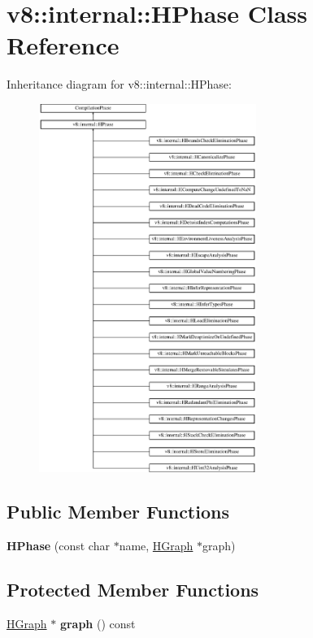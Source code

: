 \hypertarget{classv8_1_1internal_1_1_h_phase}{}\section{v8\+:\+:internal\+:\+:H\+Phase Class Reference}
\label{classv8_1_1internal_1_1_h_phase}
Inheritance diagram for v8\+:\+:internal\+:\+:H\+Phase\+:\begin{figure}[H]
\begin{center}
\leavevmode
\includegraphics[height=12.000000cm]{classv8_1_1internal_1_1_h_phase}
\end{center}
\end{figure}
\subsection*{Public Member Functions}
\begin{DoxyCompactItemize}
\item 
{\bfseries H\+Phase} (const char $\ast$name, \hyperlink{classv8_1_1internal_1_1_h_graph}{H\+Graph} $\ast$graph)\hypertarget{classv8_1_1internal_1_1_h_phase_ab39235a15a89368c007c5c90e7bd470f}{}\label{classv8_1_1internal_1_1_h_phase_ab39235a15a89368c007c5c90e7bd470f}

\end{DoxyCompactItemize}
\subsection*{Protected Member Functions}
\begin{DoxyCompactItemize}
\item 
\hyperlink{classv8_1_1internal_1_1_h_graph}{H\+Graph} $\ast$ {\bfseries graph} () const \hypertarget{classv8_1_1internal_1_1_h_phase_aa95b948e95c56fbff4a36748d00a4d8c}{}\label{classv8_1_1internal_1_1_h_phase_aa95b948e95c56fbff4a36748d00a4d8c}

\end{DoxyCompactItemize}
